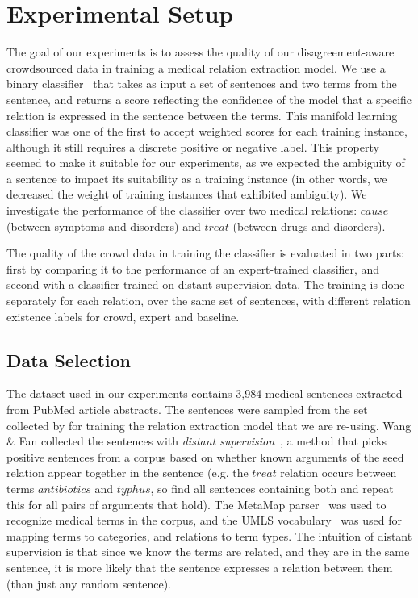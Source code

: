 \section{Experimental Setup}

The goal of our experiments is to assess the quality of our disagreement-aware crowdsourced data in training a medical relation extraction model.  We use a binary classifier~\cite{P14-1078} that takes as input a set of sentences and two terms from the sentence, and returns a score reflecting the confidence of the model that a specific relation is expressed in the sentence between the terms.  This manifold learning classifier was one of the first to accept weighted scores for each training instance, although it still requires a discrete positive or negative label.  This property seemed to make it suitable for our experiments, as we expected the ambiguity of a sentence to impact its suitability as a training instance (in other words, we decreased the weight of training instances that exhibited ambiguity).  We investigate the performance of the classifier over two medical relations: $cause$ (between symptoms and disorders) and $treat$ (between drugs and disorders).

The quality of the crowd data in training the classifier is evaluated in two parts: first by comparing it to the performance of an expert-trained classifier, and second with a classifier trained on distant supervision data.  The training is done separately for each relation, over the same set of sentences, with different relation existence labels for crowd, expert and baseline.


\subsection{Data Selection}

The dataset used in our experiments contains 3,984 medical sentences extracted from PubMed article abstracts. The sentences were sampled from the set collected by \cite{P14-1078} for training the relation extraction model that we are re-using. Wang \& Fan collected the sentences with {\em distant supervision}~\cite{mintz2009distant,Welty:2010:LSR}, a method that picks positive sentences from a corpus based on whether known arguments of the seed relation appear together in the sentence (e.g. the $treat$ relation occurs between terms $antibiotics$ and $typhus$, so find all sentences containing both and repeat this for all pairs of arguments that hold). The MetaMap parser~\cite{aronson2001effective} was used to recognize medical terms in the corpus, and the UMLS vocabulary~\cite{bodenreider2004unified} was used for mapping terms to categories, and relations to term types. The intuition of distant supervision is that since we know the terms are related, and they are in the same sentence, it is more likely that the sentence expresses a relation between them (than just any random sentence).


